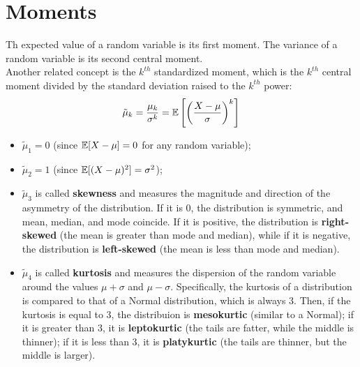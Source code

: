 \section{Moments}

Th expected value of a random variable is its first moment.
The variance of a random variable is its second central moment. \\
Another related concept is the $k^{th}$ standardized moment, which is the $k^{th}$ central moment divided by the standard deviation raised to the $k^{th}$ power:
\begin{equation*}
    \tilde{\mu}_k = \frac{\mu_k}{\sigma^k} = \mathbb{E}\left[\left(\frac{X-\mu}{\sigma}\right)^k\right]
\end{equation*}
\begin{itemize}
    \item $\tilde{\mu}_1 = 0$ (since $\mathbb{E}[X - \mu] = 0$ for any random variable);
    \item $\tilde{\mu}_2 = 1$ (since $\mathbb{E}[(X - \mu)^2] = \sigma^2$);
    \item $\tilde{\mu}_3$ is called \textbf{skewness} and measures the magnitude and direction of the asymmetry of the distribution. If it is 0, the distribution is symmetric, and mean, median, and mode coincide. If it is positive, the distribution is \textbf{right-skewed} (the mean is greater than mode and median), while if it is negative, the distribution is \textbf{left-skewed} (the mean is less than mode and median).
    \item $\tilde{\mu}_4$ is called \textbf{kurtosis} and measures the dispersion of the random variable around the values $\mu+\sigma$ and $\mu - \sigma$. Specifically, the kurtosis of a distribution is compared to that of a Normal distribution, which is always 3. Then, if the kurtosis is equal to 3, the distribuion is \textbf{mesokurtic} (similar to a Normal); if it is greater than 3, it is \textbf{leptokurtic} (the tails are fatter, while the middle is thinner); if it is less than 3, it is \textbf{platykurtic} (the tails are thinner, but the middle is larger).
\end{itemize}